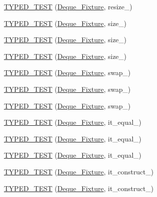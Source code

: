 \begin{DoxyCompactItemize}
\item 
\hyperlink{TestDeque_8c_09_09_aab6777ad7cc443bc6f9ee29997b0a5d5}{T\-Y\-P\-E\-D\-\_\-\-T\-E\-S\-T} (\hyperlink{structDeque__Fixture}{Deque\-\_\-\-Fixture}, resize\-\_)
\item 
\hyperlink{TestDeque_8c_09_09_ac13374b169dc9cb79ed4a0e92fdc4524}{T\-Y\-P\-E\-D\-\_\-\-T\-E\-S\-T} (\hyperlink{structDeque__Fixture}{Deque\-\_\-\-Fixture}, size\-\_)
\item 
\hyperlink{TestDeque_8c_09_09_a3adcefbcf43f627027053e65d934cdae}{T\-Y\-P\-E\-D\-\_\-\-T\-E\-S\-T} (\hyperlink{structDeque__Fixture}{Deque\-\_\-\-Fixture}, size\-\_)
\item 
\hyperlink{TestDeque_8c_09_09_a3ab0c5644c084f3e0d391fb5050142b4}{T\-Y\-P\-E\-D\-\_\-\-T\-E\-S\-T} (\hyperlink{structDeque__Fixture}{Deque\-\_\-\-Fixture}, size\-\_)
\item 
\hyperlink{TestDeque_8c_09_09_a9ba509ac0c276ff902f58ebb518b5acb}{T\-Y\-P\-E\-D\-\_\-\-T\-E\-S\-T} (\hyperlink{structDeque__Fixture}{Deque\-\_\-\-Fixture}, swap\-\_)
\item 
\hyperlink{TestDeque_8c_09_09_ac26dd74af2bdde40e873e03d8ecbdcff}{T\-Y\-P\-E\-D\-\_\-\-T\-E\-S\-T} (\hyperlink{structDeque__Fixture}{Deque\-\_\-\-Fixture}, swap\-\_)
\item 
\hyperlink{TestDeque_8c_09_09_af406ce70202bce46bb4a08f96d3b3ebf}{T\-Y\-P\-E\-D\-\_\-\-T\-E\-S\-T} (\hyperlink{structDeque__Fixture}{Deque\-\_\-\-Fixture}, swap\-\_)
\item 
\hyperlink{TestDeque_8c_09_09_a456cc0bb7fe35082a5c19267f3a032c6}{T\-Y\-P\-E\-D\-\_\-\-T\-E\-S\-T} (\hyperlink{structDeque__Fixture}{Deque\-\_\-\-Fixture}, it\-\_\-equal\-\_)
\item 
\hyperlink{TestDeque_8c_09_09_a27ca252cf2ac9ed1b410bb4413f64072}{T\-Y\-P\-E\-D\-\_\-\-T\-E\-S\-T} (\hyperlink{structDeque__Fixture}{Deque\-\_\-\-Fixture}, it\-\_\-equal\-\_)
\item 
\hyperlink{TestDeque_8c_09_09_ae506308133afe5913cf5afbd3d33de59}{T\-Y\-P\-E\-D\-\_\-\-T\-E\-S\-T} (\hyperlink{structDeque__Fixture}{Deque\-\_\-\-Fixture}, it\-\_\-equal\-\_)
\item 
\hyperlink{TestDeque_8c_09_09_a0760f7c94fc9865d52e6db0fb1ca6b33}{T\-Y\-P\-E\-D\-\_\-\-T\-E\-S\-T} (\hyperlink{structDeque__Fixture}{Deque\-\_\-\-Fixture}, it\-\_\-construct\-\_)
\item 
\hyperlink{TestDeque_8c_09_09_a96a0cef1d0b0ff58fcb229847250e778}{T\-Y\-P\-E\-D\-\_\-\-T\-E\-S\-T} (\hyperlink{structDeque__Fixture}{Deque\-\_\-\-Fixture}, it\-\_\-construct\-\_)

\end{DoxyCompactItemize}
